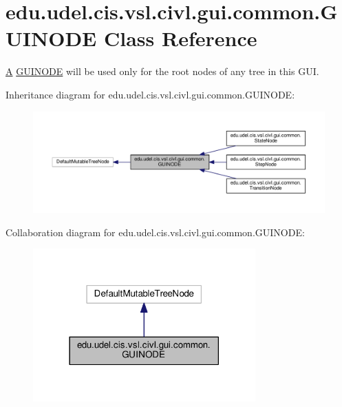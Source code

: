 \hypertarget{classedu_1_1udel_1_1cis_1_1vsl_1_1civl_1_1gui_1_1common_1_1GUINODE}{}\section{edu.\+udel.\+cis.\+vsl.\+civl.\+gui.\+common.\+G\+U\+I\+N\+O\+D\+E Class Reference}
\label{classedu_1_1udel_1_1cis_1_1vsl_1_1civl_1_1gui_1_1common_1_1GUINODE}


\hyperlink{structA}{A} \hyperlink{classedu_1_1udel_1_1cis_1_1vsl_1_1civl_1_1gui_1_1common_1_1GUINODE}{G\+U\+I\+N\+O\+D\+E} will be used only for the root nodes of any tree in this G\+U\+I.  




Inheritance diagram for edu.\+udel.\+cis.\+vsl.\+civl.\+gui.\+common.\+G\+U\+I\+N\+O\+D\+E\+:
\nopagebreak
\begin{figure}[H]
\begin{center}
\leavevmode
\includegraphics[width=350pt]{classedu_1_1udel_1_1cis_1_1vsl_1_1civl_1_1gui_1_1common_1_1GUINODE__inherit__graph}
\end{center}
\end{figure}


Collaboration diagram for edu.\+udel.\+cis.\+vsl.\+civl.\+gui.\+common.\+G\+U\+I\+N\+O\+D\+E\+:
\nopagebreak
\begin{figure}[H]
\begin{center}
\leavevmode
\includegraphics[width=242pt]{classedu_1_1udel_1_1cis_1_1vsl_1_1civl_1_1gui_1_1common_1_1GUINODE__coll__graph}
\end{center}
\end{figure}

